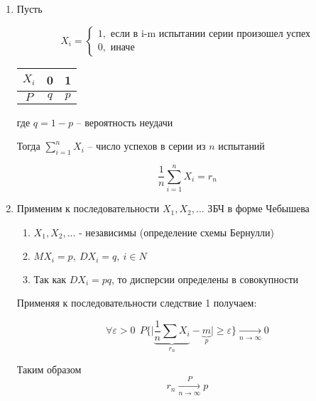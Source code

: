 \begin{enumerate}
    \item Пусть

        \begin{equation*}
            X_i =
            \begin{cases}
                1, \text{ если в i-m испытании серии произошел успех} \\
                0, \text{ иначе}
            \end{cases}
        \end{equation*}

        \begin{table}[H]
            \centering
            \begin{tabular}{|c||c|c|}
                \hline
                $X_i$ & 0 & 1 \\
                \hline
                $P$ & $q$ & $p$ \\
                \hline
            \end{tabular}
        \end{table}

        где $q=1-p$ -- вероятность неудачи

        Тогда $\sum_{i=1}^n X_i$ -- число успехов в серии из $n$ испытаний

        \begin{equation*}
            \frac{1}{n} \sum_{i=1}^n X_i = r_n
        \end{equation*}

    \item 
    Применим к последовательности $X_1, X_2, ...$ ЗБЧ в форме Чебышева
    \begin{enumerate}
    \item $X_1, X_2, ...$ - независимы (определение схемы Бернулли)
    \item $MX_i=p,~DX_i=q,~i\in N$
    \item Так как $DX_i=pq$, то дисперсии определены в совокупности
    \end{enumerate}
    Применяя к последовательности следствие 1 получаем:
    
    \begin{equation*}
    \forall \varepsilon > 0 ~~ P\{\bigg |\underbrace{\frac{1}{n} \sum X_i}_{r_n} - \underbrace{m}_{p}\bigg| \geq \varepsilon \} \xrightarrow[n\to\infty]{} 0
    \end{equation*}
    
 Таким образом 
 \begin{equation*}
    r_n \xrightarrow[n\to\infty]{P} p
\end{equation*}

\end{enumerate}

